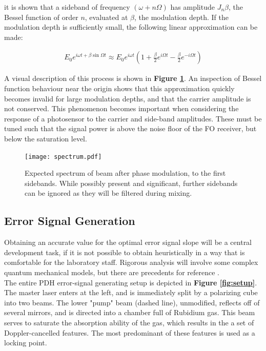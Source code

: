 it is shown that a sideband of frequency $(\omega +n\Omega)$ has amplitude
$J_n{\beta}$, the Bessel function of order $n$, evaluated at $\beta$, the
modulation depth. If the modulation depth is sufficiently small, the following
linear approximation can be made:

\begin{gather}
  E_0 e^{i \omega t + \beta \sin \Omega t}  \approx
    E_0 e^{i\omega t} \left(1 + \frac{\beta}{2}e^{i\Omega t} -
      \frac{\beta}{2} e^{-i\Omega t} \right)
\end{gather}

A visual description of this process is shown in
\textbf{Figure \ref{fig:eom_spectrum}}.
An inspection of Bessel function behaviour near the origin shows that
this approximation quickly becomes invalid for large modulation depths, and
that the carrier amplitude is not conserved. This phenomenon becomes important
when considering the response of a photosensor to the carrier and side-band
amplitudes. These must be tuned such that the signal power is above the noise
floor of the FO receiver, but below the saturation level.

\begin{figure}
  \centering
  \texttt{[image: spectrum.pdf]}
  \caption{Expected spectrum of beam after phase modulation, to the first
  sidebands. While possibly present and significant, further sidebands can
  be ignored as they will be filtered during mixing.}
  \label{fig:eom_spectrum}
\end{figure}

\subsection{Error Signal Generation}

Obtaining an accurate value for the optimal error signal slope will be a central
development task, if it is not possible to obtain heuristically in
a way that is comfortable for the laboratory staff. Rigorous analysis will
involve some complex quantum mechanical models, but there are precedents for
reference \cite{maguire2006}. \\

The entire PDH error-signal generating setup is depicted in
\textbf{ Figure \ref{fig:setup}}.
The master laser enters at the left, and is immediately split by a
polarizing cube into two beams.  The lower "pump" beam (dashed line), unmodified,
reflects off of several mirrors, and is directed into a chamber full of
Rubidium gas. This beam serves to saturate the absorption ability of the gas,
which results in the a set of Doppler-cancelled features.
The most predominant of these features is used as a locking point. \\


